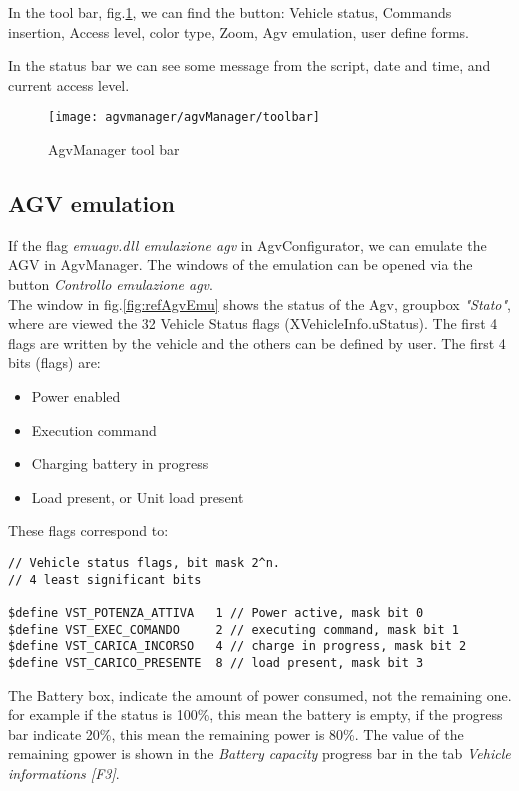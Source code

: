 In the tool bar, fig.\ref{fig:toolbar}, we can find the button: Vehicle status, Commands insertion, Access level, color type, Zoom, Agv emulation, user define forms.

In the status bar we can see some message from the script, date and time, and current access level.

\begin{figure}
	\centering\texttt{[image: agvmanager/agvManager/toolbar]}
	\caption{AgvManager tool bar }
	\label{fig:toolbar}
\end{figure}

\subsection{AGV emulation}
If the flag \textit{emuagv.dll emulazione agv} in AgvConfigurator, we can emulate the AGV in AgvManager. The windows of the emulation can be opened via the button \textit{Controllo emulazione agv}.\\

The window in fig.\ref{fig:refAgvEmu} shows the status of the Agv, groupbox \textit{"Stato"}, where are viewed the 32 Vehicle Status flags (XVehicleInfo.uStatus). The first 4 flags are written by the vehicle and the others can be defined by user.
The first 4 bits (flags) are:
\begin{itemize}
	\item Power enabled
	\item Execution command
	\item Charging battery in progress
	\item Load present, or Unit load present
\end{itemize}
These flags correspond to:
\begin{lstlisting}
// Vehicle status flags, bit mask 2^n.
// 4 least significant bits

$define VST_POTENZA_ATTIVA   1 // Power active, mask bit 0
$define VST_EXEC_COMANDO     2 // executing command, mask bit 1
$define VST_CARICA_INCORSO   4 // charge in progress, mask bit 2
$define VST_CARICO_PRESENTE  8 // load present, mask bit 3
\end{lstlisting}

The Battery box, indicate the amount of power consumed, not the remaining one. for example if the status is 100\%, this mean the battery is empty, if the progress bar indicate 20\%, this mean the remaining power is 80\%. The value of the remaining gpower is shown in the \textit{Battery capacity} progress bar in the tab \textit{Vehicle informations [F3]}.\\


